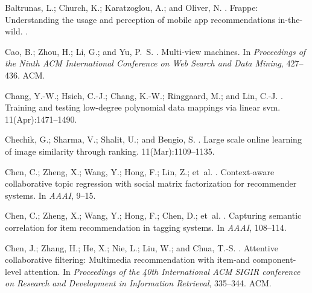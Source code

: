 \documentclass[letterpaper]{article} \usepackage{aaai19}  \usepackage{times}  \usepackage{helvet}  \usepackage{courier}  \usepackage{url}  \usepackage{graphicx}  \frenchspacing  \setlength{\pdfpagewidth}{8.5in}  \setlength{\pdfpageheight}{11in}  \usepackage{mathtools}
\begin{document}
\begin{thebibliography}{}

Baltrunas, L.; Church, K.; Karatzoglou, A.; and Oliver, N.
.
\newblock Frappe: Understanding the usage and perception of mobile app
  recommendations in-the-wild.
.

Cao, B.; Zhou, H.; Li, G.; and Yu, P.~S.
.
\newblock Multi-view machines.
\newblock In {\em Proceedings of the Ninth ACM International Conference on Web
  Search and Data Mining},  427--436.
\newblock ACM.

Chang, Y.-W.; Hsieh, C.-J.; Chang, K.-W.; Ringgaard, M.; and Lin, C.-J.
.
\newblock Training and testing low-degree polynomial data mappings via linear
  svm.
 11(Apr):1471--1490.

Chechik, G.; Sharma, V.; Shalit, U.; and Bengio, S.
.
\newblock Large scale online learning of image similarity through ranking.
 11(Mar):1109--1135.

Chen, C.; Zheng, X.; Wang, Y.; Hong, F.; Lin, Z.; et~al.
.
\newblock Context-aware collaborative topic regression with social matrix
  factorization for recommender systems.
\newblock In {\em AAAI},  9--15.

Chen, C.; Zheng, X.; Wang, Y.; Hong, F.; Chen, D.; et~al.
.
\newblock Capturing semantic correlation for item recommendation in tagging
  systems.
\newblock In {\em AAAI},  108--114.

Chen, J.; Zhang, H.; He, X.; Nie, L.; Liu, W.; and Chua, T.-S.
.
\newblock Attentive collaborative filtering: Multimedia recommendation with
  item-and component-level attention.
\newblock In {\em Proceedings of the 40th International ACM SIGIR conference on
  Research and Development in Information Retrieval},  335--344.
\newblock ACM.


\end{thebibliography}
\end{document}
